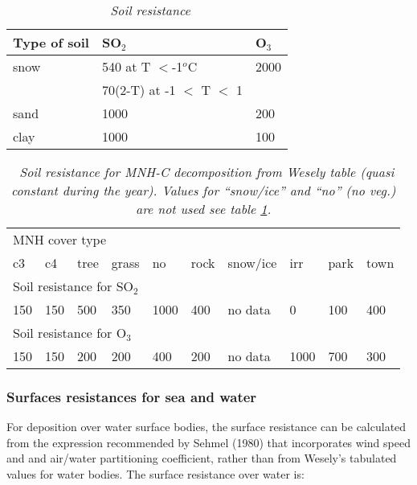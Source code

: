 \begin{table}
\begin{center}
\begin{tabular}{lll}\hline
Type of soil & SO$_2$                    & O$_3$  \\ \hline
snow           & 540 at T $ < $-1$^o$C      & 2000   \\ 
               & 70(2-T) at -1 $<$ T $<$ 1 &        \\ 
sand           & 1000                      & 200    \\ 
clay           & 1000                      & 100    \\  \hline
\end{tabular}
\caption{\sl ~{Soil resistance}}
\label{rsol}
\end{center}
\end{table}

\begin{table}
\begin{center}
\begin{tabular}{llllllllll}\hline
\multicolumn{10}{l}{MNH cover type}\\
 c3 & c4 & tree & grass & no & rock & snow/ice & irr & park & town \\ 
\hline
\multicolumn{10}{l}{Soil resistance for SO$_2$}\\
150 & 150 & 500 & 350 & 1000 & 400 & no data & 0 & 100 & 400 \\
\hline
\multicolumn{10}{l}{Soil resistance for O$_3$}\\
150 & 150 & 200 & 200 & 400 & 200 & no data & 1000 & 700 & 300 \\
\hline  
\end{tabular}
\caption{\sl ~{Soil resistance for MNH-C decomposition from Wesely
table (quasi constant during the year). Values for ``snow/ice'' and
``no'' (no veg.) are not used see table \ref{rsol}.}} 
\label{rcsoil}
\end{center}
\end{table}

\subsubsection*{Surfaces resistances for sea and water}
For deposition over water surface bodies, the surface resistance can
be calculated from the expression recommended by Sehmel (1980) that
incorporates wind speed and 
and air/water partitioning coefficient, rather than from Wesely's
tabulated values for water bodies. The surface resistance over water
is: 

